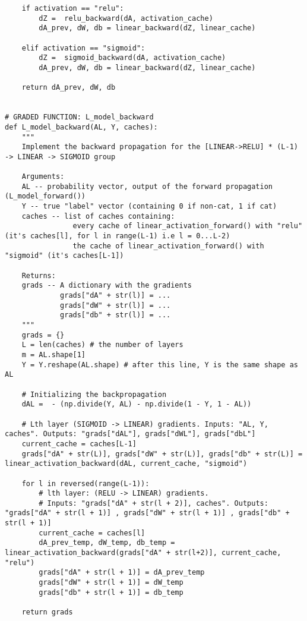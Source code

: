 {\begin{verbatim}
    if activation == "relu":
        dZ =  relu_backward(dA, activation_cache)
        dA_prev, dW, db = linear_backward(dZ, linear_cache)
        
    elif activation == "sigmoid":
        dZ =  sigmoid_backward(dA, activation_cache)
        dA_prev, dW, db = linear_backward(dZ, linear_cache)
    
    return dA_prev, dW, db


# GRADED FUNCTION: L_model_backward
def L_model_backward(AL, Y, caches):
    """
    Implement the backward propagation for the [LINEAR->RELU] * (L-1) -> LINEAR -> SIGMOID group
    
    Arguments:
    AL -- probability vector, output of the forward propagation (L_model_forward())
    Y -- true "label" vector (containing 0 if non-cat, 1 if cat)
    caches -- list of caches containing:
                every cache of linear_activation_forward() with "relu" (it's caches[l], for l in range(L-1) i.e l = 0...L-2)
                the cache of linear_activation_forward() with "sigmoid" (it's caches[L-1])
    
    Returns:
    grads -- A dictionary with the gradients
             grads["dA" + str(l)] = ... 
             grads["dW" + str(l)] = ...
             grads["db" + str(l)] = ... 
    """
    grads = {}
    L = len(caches) # the number of layers
    m = AL.shape[1]
    Y = Y.reshape(AL.shape) # after this line, Y is the same shape as AL
    
    # Initializing the backpropagation
    dAL =  - (np.divide(Y, AL) - np.divide(1 - Y, 1 - AL))
    
    # Lth layer (SIGMOID -> LINEAR) gradients. Inputs: "AL, Y, caches". Outputs: "grads["dAL"], grads["dWL"], grads["dbL"]
    current_cache = caches[L-1]
    grads["dA" + str(L)], grads["dW" + str(L)], grads["db" + str(L)] =  linear_activation_backward(dAL, current_cache, "sigmoid")
    
    for l in reversed(range(L-1)):
        # lth layer: (RELU -> LINEAR) gradients.
        # Inputs: "grads["dA" + str(l + 2)], caches". Outputs: "grads["dA" + str(l + 1)] , grads["dW" + str(l + 1)] , grads["db" + str(l + 1)] 
        current_cache = caches[l]
        dA_prev_temp, dW_temp, db_temp = linear_activation_backward(grads["dA" + str(l+2)], current_cache, "relu")
        grads["dA" + str(l + 1)] = dA_prev_temp
        grads["dW" + str(l + 1)] = dW_temp
        grads["db" + str(l + 1)] = db_temp

    return grads


\end{verbatim}}
